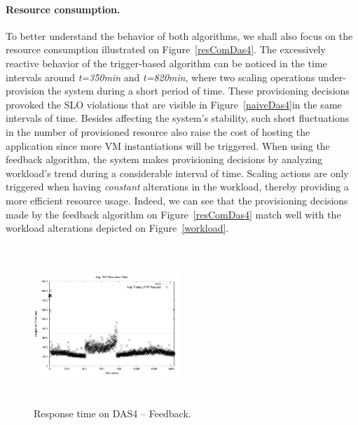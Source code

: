 \paragraph{Resource consumption.}

To better understand the behavior of both algorithms, we shall also focus on the resource consumption illustrated on Figure~\ref{resComDas4}. The excessively reactive behavior of the trigger-based algorithm can be noticed in the time intervals around \emph{t=350min} and \emph{t=820min}, where two scaling operations under-provision the system during a short period of time. These provisioning decisions provoked the SLO violations that are visible in Figure~\ref{naiveDas4}in the same intervals of time. Besides affecting the system's stability, such short fluctuations in the number of provisioned resource also raise the cost of hosting the application since more VM instantiations will be triggered. When using the feedback algorithm, the system makes provisioning decisions by analyzing workload's trend during a considerable interval of time. Scaling actions are only triggered when having \emph{constant} alterations in the workload, thereby providing a more efficient resource usage. Indeed, we can see that the provisioning decisions made by the feedback algorithm on Figure~\ref{resComDas4} match well with the workload alterations depicted on Figure~\ref{workload}.

\begin{figure}
\begin{center}
\includegraphics[width=0.49\textwidth, height=6cm]{./images/homogeneous/avgTimeout_PhP_feedback}
\end{center}
\vspace{-5mm}
\caption{Response time on DAS4 -- Feedback.}
\label{historyDas4}
\end{figure}

